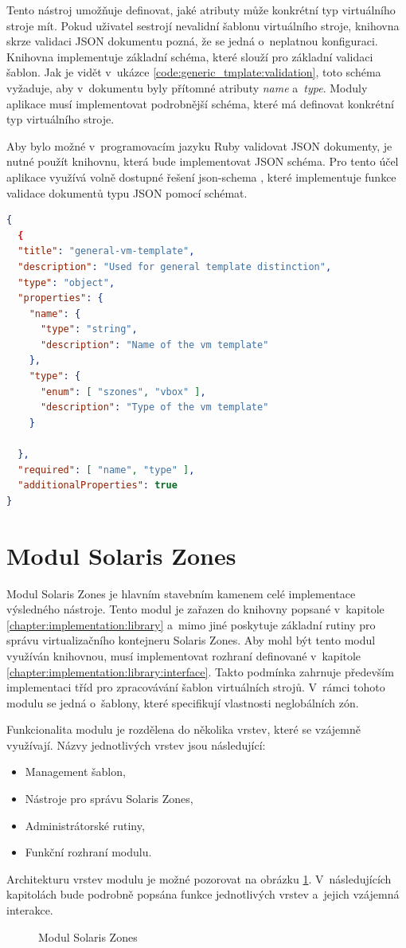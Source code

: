 Tento nástroj umožňuje definovat, jaké atributy může konkrétní typ virtuálního stroje mít. Pokud uživatel sestrojí
nevalidní šablonu virtuálního stroje, knihovna skrze validaci JSON dokumentu pozná, že se jedná o~neplatnou konfiguraci. Knihovna
implementuje základní schéma, které slouží pro základní validaci šablon. Jak je vidět v~ukázce \ref{code:generic_tmplate:validation},
toto schéma vyžaduje, aby v~dokumentu byly přítomné atributy \textit{name} a~\textit{type}. Moduly aplikace musí implementovat
podrobnější schéma, které má definovat konkrétní typ virtuálního stroje.

Aby bylo možné v~programovacím jazyku Ruby validovat JSON dokumenty, je nutné použít knihovnu, která bude implementovat
JSON schéma. Pro tento účel aplikace využívá volně dostupné řešení json-schema \cite{json:schema:ruby}, které implementuje
funkce validace dokumentů typu JSON pomocí schémat.
\begin{lstlisting}[language=json, caption={Schéma generické šablony}, float, label={code:generic_tmplate:validation}]  
{
  {
  "title": "general-vm-template",
  "description": "Used for general template distinction",
  "type": "object",
  "properties": {
    "name": {
      "type": "string",
      "description": "Name of the vm template"
    },
    "type": {
      "enum": [ "szones", "vbox" ],
      "description": "Type of the vm template"
    }

  },
  "required": [ "name", "type" ],
  "additionalProperties": true
}
\end{lstlisting}
\section{Modul Solaris Zones}
\label{chapter:implementation:szones}
Modul Solaris Zones je hlavním stavebním kamenem celé implementace výsledného nástroje. Tento modul je zařazen do knihovny
popsané v~kapitole \ref{chapter:implementation:library} a~mimo jiné poskytuje základní rutiny pro správu virtualizačního
kontejneru Solaris Zones. Aby mohl být tento modul využíván knihovnou, musí implementovat rozhraní definované v~kapitole \ref{chapter:implementation:library:interface}.
Takto podmínka zahrnuje především implementaci tříd pro zpracovávání šablon virtuálních strojů. V~rámci tohoto modulu
se jedná o~šablony, které specifikují vlastnosti neglobálních zón. 

Funkcionalita modulu je rozdělena do několika vrstev, které se vzájemně využívají. Názvy jednotlivých vrstev jsou následující:
\begin{itemize}
 \item Management šablon,
 \item Nástroje pro správu Solaris Zones,
 \item Administrátorské rutiny,
 \item Funkční rozhraní modulu.
\end{itemize}
Architekturu vrstev modulu je možné pozorovat na obrázku \ref{image:implemetation:szones}. V~následujících kapitolách
bude podrobně popsána funkce jednotlivých vrstev a~jejich vzájemná interakce.
\begin{figure}
    \centering    
    \caption{Modul Solaris Zones}
    \label{image:implemetation:szones}
\end{figure}
